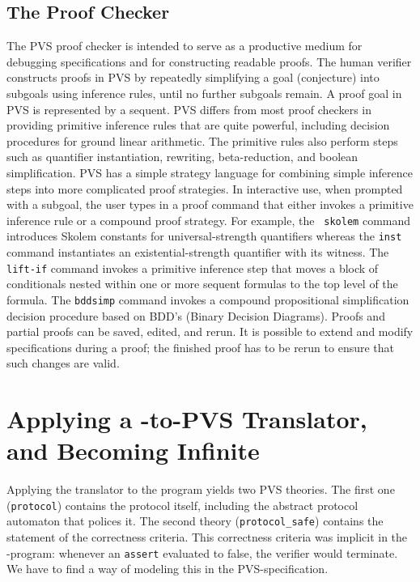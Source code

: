 \subsection{The Proof Checker}

The PVS proof checker is intended to  serve as a productive medium for
debugging specifications  and for constructing  readable proofs.   The
human verifier constructs proofs  in  PVS by repeatedly  simplifying a
goal  (conjecture)  into subgoals  using   inference  rules, until  no
further subgoals  remain.   A proof goal  in  PVS is  represented by a
sequent.  PVS differs from most  proof checkers in providing primitive
inference rules that are quite powerful, including decision procedures
for ground linear arithmetic.  The  primitive rules also perform steps
such   as  quantifier instantiation,   rewriting, beta-reduction,  and
boolean  simplification.   PVS  has a   simple  strategy  language for
combining  simple   inference steps    into  more complicated    proof
strategies.  In  interactive  use, when  prompted  with a subgoal, the
user types  in   a proof  command   that either  invokes   a primitive
inference rule or a  compound proof strategy.   For example, the  {\tt
skolem}  command introduces  Skolem  constants  for universal-strength
quantifiers whereas    the  {\tt   inst}   command  instantiates    an
existential-strength quantifier with  its witness.   The {\tt lift-if}
command  invokes a  primitive  inference step  that  moves a block  of
conditionals nested  within one  or more sequent  formulas to  the top
level of the  formula.  The {\tt bddsimp}  command invokes  a compound
propositional simplification decision procedure based on BDD's (Binary
Decision Diagrams).   Proofs and partial  proofs can be saved, edited,
and rerun.  It is possible to extend  and modify specifications during
a proof;  the  finished proof has to    be rerun to   ensure that such
changes are valid.


\section{Applying a \Murphi-to-PVS Translator, and Becoming Infinite}

Applying  the  translator  to the  \Murphi{}  program yields  two  PVS
theories.  The  first  one  ({\tt  protocol})  contains  the  protocol
itself, including the abstract protocol automaton that polices it. The
second  theory  ({\tt protocol\_safe})  contains  the statement of the
correctness  criteria.  This correctness criteria was implicit  in the
\Murphi-program:  whenever  an  {\tt assert}  evaluated  to false, the
verifier  would  terminate.  We  have  to find a way of modeling this in
the PVS-specification.
 
